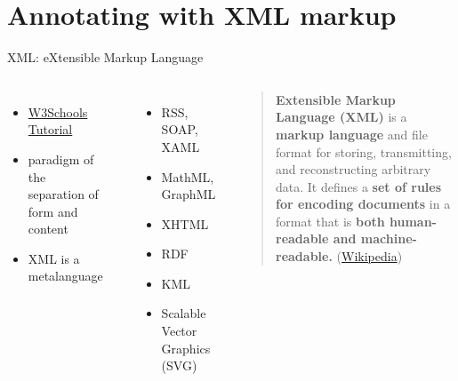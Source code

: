 

\section{Annotating with XML markup}


\begin{frame}{XML: eXtensible Markup Language}
\begin{columns}
\begin{itemize}\small 
    \item \href{https://www.w3schools.com/xml/default.asp}{W3Schools Tutorial} 
    \item {paradigm of the separation of form and content} 
    \item {XML is a metalanguage}
\end{itemize}
 \\

\begin{itemize}\scriptsize 
    \item {RSS}, SOAP, XAML 
    \item {MathML}, {GraphML}~ 
    \item {XHTML}~
    \item {RDF}~
    \item {KML}~ 
    \item {Scalable Vector Graphics (SVG)}
\end{itemize}

\begin{block}{}
\begin{quote}
    \textbf{Extensible Markup Language (XML)} is a \textbf{markup language} and file format for storing, transmitting, and reconstructing arbitrary data. It defines a \textbf{set of rules for encoding documents} in a format that is \textbf{both human-readable and machine-readable.}  (\href{https://en.wikipedia.org/wiki/XML}{Wikipedia})
\end{quote}
\end{block}
\end{columns}

\end{frame}



